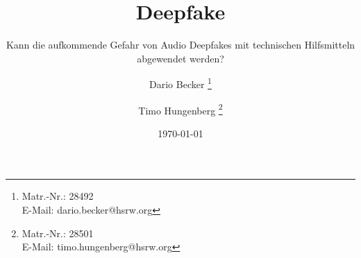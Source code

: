 \titlehead{
{\Large Hochschule Rhein Waal}\\
Fakultät für Kommunikation und Umwelt\\
Friedrich-Heinrich-Allee 25\\
47475 Kamp-Lintfort
}

\subject{
Abschlussbericht\\
\normalfont
im Modul Wissenschaftliches Arbeiten\\
}

\title{Deepfake}

\subtitle{Kann die aufkommende Gefahr von Audio Deepfakes mit technischen Hilfsmitteln abgewendet werden?}
\author{
Dario Becker
\thanks{
 Matr.-Nr.: 28492\\
E-Mail: dario.becker@hsrw.org}
\and Timo Hungenberg
\thanks{
Matr.-Nr.: 28501\\
E-Mail: timo.hungenberg@hsrw.org}
}

\date{\today}


\maketitle
